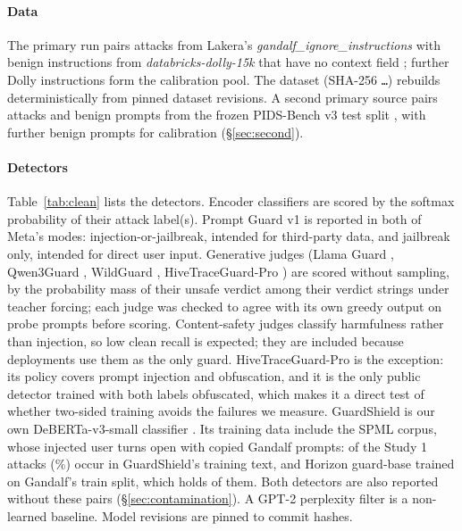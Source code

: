 \documentclass[conference]{IEEEtran}
\begin{document}
\paragraph{Data} The primary run pairs \nPairs{} attacks from Lakera's \textit{gandalf\_ignore\_instructions} \citep{lakera2023gandalf} with benign instructions from \textit{databricks-dolly-15k} that have no context field \citep{conover2023dolly}; \nCalibration{} further Dolly instructions form the calibration pool. The dataset (SHA-256 \texttt{\datasetSha\ldots}) rebuilds deterministically from pinned dataset revisions. A second primary source pairs \pidsPairs{} attacks and benign prompts from the frozen PIDS-Bench v3 test split \citep{pidsbench2026}, with \pidsCalibration{} further benign prompts for calibration (\S\ref{sec:second}).

\paragraph{Detectors} Table~\ref{tab:clean} lists the \nGuards{} detectors. Encoder classifiers are scored by the softmax probability of their attack label(s). Prompt Guard v1 is reported in both of Meta's modes: injection-or-jailbreak, intended for third-party data, and jailbreak only, intended for direct user input. Generative judges (Llama Guard \citep{inan2023llamaguard}, Qwen3Guard \citep{qwen3guard2025}, WildGuard \citep{han2024wildguard}, HiveTraceGuard-Pro \citep{hivetrace2026}) are scored without sampling, by the probability mass of their unsafe verdict among their verdict strings under teacher forcing; each judge was checked to agree with its own greedy output on probe prompts before scoring. Content-safety judges classify harmfulness rather than injection, so low clean recall is expected; they are included because deployments use them as the only guard. HiveTraceGuard-Pro is the exception: its policy covers prompt injection and obfuscation, and it is the only public detector trained with both labels obfuscated, which makes it a direct test of whether two-sided training avoids the failures we measure. GuardShield is our own DeBERTa-v3-small classifier \citep{he2023debertav3}. Its training data include the SPML corpus, whose injected user turns open with copied Gandalf prompts: \gsContamAttacks{} of the \nPairs{} Study 1 attacks (\gsContamAttacksPct\%) occur in GuardShield's training text, and Horizon guard-base trained on Gandalf's train split, which holds \horizonContamAttacks{} of them. Both detectors are also reported without these pairs (\S\ref{sec:contamination}). A GPT-2 perplexity filter is a non-learned baseline. Model revisions are pinned to commit hashes.
\end{document}
